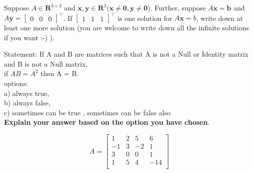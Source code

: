 \documentclass[solution,addpoints,12pt]{exam}
\begin{document}
\begin{questions}
\question[2] Suppose $A \in \mathbf{R}^{3 \times 3}$ and $\mathbf{x}, \mathbf{y} \in \mathbf{R}^{3} (\mathbf{x} \neq \mathbf{0}, \mathbf{y} \neq \mathbf{0}$). Further, suppose $A\mathbf{x} = \mathbf{b}$ and $A\mathbf{y} = \begin{bmatrix} 0 & 0 & 0\end{bmatrix}^\top$. If $\begin{bmatrix} 1 & 1 & 1\end{bmatrix}^\top$ is one solution for $A\mathbf{x} = b$, write down at least one more solution (you are welcome to write down all the infinite solutions if you want :-) ).  
\begin{solution}
\end{solution}

\question[1] 
Statement: If A and B are matrices such that A is not a Null or Identity matrix and B is not a Null matrix,\\
if $AB = A^2$ then A = B.\\
options:\\
a) always true,\\
b) always false,\\
c) sometimes can be true , sometimes can be false also\\\textbf{Explain your answer based on the option you have chosen}.
\begin{solution}
\end{solution}

\question 

$$A = \begin{bmatrix}
1 & 2 & 5 & 6 \\
-1 & 3 & -2 & 1 \\
3 & 0 & 0 & 1 \\
1 & 5 & 4 & -14 \\
\end{bmatrix}$$

\begin{solution}
\end{solution}


\end{questions}
\end{document}
